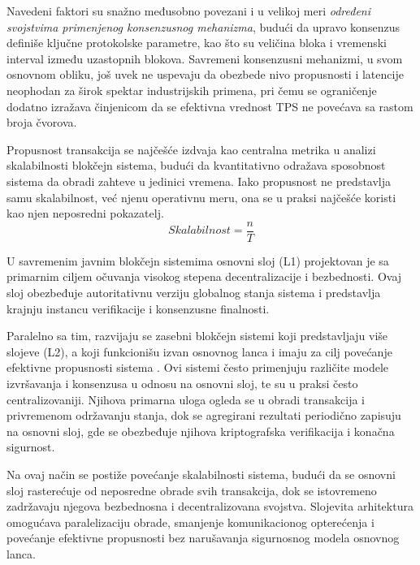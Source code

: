 Navedeni faktori su snažno međusobno povezani i u velikoj meri \textit{određeni svojstvima primenjenog konsenzusnog mehanizma}, budući da upravo konsenzus definiše ključne protokolske parametre, kao što su veličina bloka i vremenski interval između uzastopnih blokova. Savremeni konsenzusni mehanizmi, u svom osnovnom obliku, još uvek ne uspevaju da obezbede nivo propusnosti i latencije neophodan za širok spektar industrijskih primena, pri čemu se ograničenje dodatno izražava činjenicom da se efektivna vrednost TPS ne povećava sa rastom broja čvorova.

Propusnost transakcija se najčešće izdvaja kao centralna metrika u analizi skalabilnosti blokčejn sistema, budući da kvantitativno odražava sposobnost sistema da obradi zahteve u jedinici vremena. Iako propusnost ne predstavlja samu skalabilnost, već njenu operativnu meru, ona se u praksi najčešće koristi kao njen neposredni pokazatelj.
$$ Skalabilnost = \frac{n}{T} $$

U savremenim javnim blokčejn sistemima osnovni sloj (L1) projektovan je sa primarnim ciljem očuvanja visokog stepena decentralizacije i bezbednosti. Ovaj sloj obezbeđuje autoritativnu verziju globalnog stanja sistema i predstavlja krajnju instancu verifikacije i konsenzusne finalnosti.

Paralelno sa tim, razvijaju se zasebni blokčejn sistemi koji predstavljaju više slojeve (L2), a koji funkcionišu izvan osnovnog lanca i imaju za cilj povećanje efektivne propusnosti sistema \cite{sguanci2021layer}. Ovi sistemi često primenjuju različite modele izvršavanja i konsenzusa u odnosu na osnovni sloj, te su u praksi često centralizovaniji. Njihova primarna uloga ogleda se u obradi transakcija i privremenom održavanju stanja, dok se agregirani rezultati periodično zapisuju na osnovni sloj, gde se obezbeđuje njihova kriptografska verifikacija i konačna sigurnost.

Na ovaj način se postiže povećanje skalabilnosti sistema, budući da se osnovni sloj rasterećuje od neposredne obrade svih transakcija, dok se istovremeno zadržavaju njegova bezbednosna i decentralizovana svojstva. Slojevita arhitektura omogućava paralelizaciju obrade, smanjenje komunikacionog opterećenja i povećanje efektivne propusnosti bez narušavanja sigurnosnog modela osnovnog lanca.